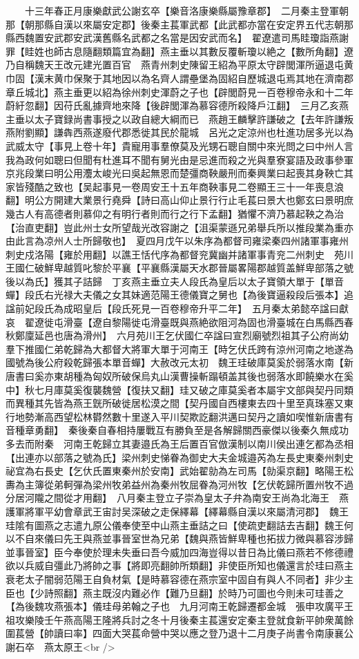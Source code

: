 　　十三年春正月康樂獻武公謝玄卒【樂音洛康樂縣屬豫章郡】　二月秦主登軍朝那【朝那縣自漢以來屬安定郡】後秦主萇軍武都【此武都亦當在安定界五代志朝那縣西魏置安武郡安武漢舊縣名武都之名當是因安武而名】　翟遼遣司馬眭瓊詣燕謝罪【眭姓也師古息隨翻類篇宜為翻】燕主垂以其數反覆斬瓊以絶之【數所角翻】遼乃自稱魏天王改元建光置百官　燕青州刺史陳留王紹為平原太守辟閭渾所逼退屯黄巾固【漢末黄巾保聚于其地因以為名齊人謂壘堡為固紹自歷城退屯焉其地在濟南郡章丘城北】燕主垂更以紹為徐州刺史渾蔚之子也【辟閭蔚見一百卷穆帝永和十二年蔚紆忽翻】因苻氏亂據齊地來降【後辟閭渾為慕容德所殺降戶江翻】　三月乙亥燕主垂以太子寶録尚書事授之以政自總大綱而已　燕趙王麟擊許謙破之【去年許謙叛燕附劉顯】謙犇西燕遂廢代郡悉徙其民於龍城　呂光之定涼州也杜進功居多光以為武威太守【事見上卷十年】貴寵用事羣僚莫及光甥石聰自關中來光問之曰中州人言我為政何如聰曰但聞有杜進耳不聞有舅光由是忌進而殺之光與羣寮宴語及政事參軍京兆段業曰明公用灋太峻光曰吳起無恩而楚彊商鞅嚴刑而秦興業曰起喪其身鞅亡其家皆殘酷之致也【吴起事見一卷周安王十五年商鞅事見二卷顯王三十一年喪息浪翻】明公方開建大業景行堯舜【詩曰高山仰止景行行止毛萇曰景大也鄭玄曰景明庶幾古人有高德者則慕仰之有明行者則而行之行下孟翻】猶懼不濟乃慕起鞅之為治【治直吏翻】豈此州士女所望哉光改容謝之【沮渠蒙遜兄弟舉兵所以推段業為重亦由此言為凉州人士所歸敬也】　夏四月戊午以朱序為都督司雍梁秦四州諸軍事雍州刺史戍洛陽【雍於用翻】以譙王恬代序為都督兖冀幽并諸軍事青兖二州刺史　苑川王國仁破鮮卑越質叱黎於平襄【平襄縣漢屬天水郡晉屬畧陽郡越質盖鮮卑部落之號後以為氏】獲其子詰歸　丁亥燕主垂立夫人段氏為皇后以太子寶領大單于【單音蟬】段氏右光禄大夫儀之女其妹適范陽王德儀寶之舅也【為後寶逼殺段后張本】追諡前妃段氏為成昭皇后【段氏死見一百卷穆帝升平二年】　五月秦太弟懿卒諡曰獻哀　翟遼徙屯滑臺【遼自黎陽徙屯滑臺既與燕絶欲阻河為固也滑臺城在白馬縣西春秋鄭廩延邑也唐為滑州】　六月苑川王乞伏國仁卒諡曰宣烈廟號烈祖其子公府尚幼羣下推國仁弟乾歸為大都督大將軍大單于河南王【時乞伏氏跨有涼州河南之地遂為國號為後公府殺乾歸張本單音蟬】大赦改元太初　魏王珪破庫莫奚於弱落水南【新唐書曰奚亦東胡種為匈奴所破保烏丸山漢曹操斬蹋頓盖其後也弱落水即饒樂水在奚中】秋七月庫莫奚復襲魏營【復扶又翻】珪又破之庫莫奚者本屬宇文部與契丹同類而異種其先皆為燕王皝所破徙居松漠之間【契丹國自西樓東去四十里至真珠塞又東行地勢漸高西望松林欎然數十里遂入平川契欺訖翻洪邁曰契丹之讀如喫惟新唐書有音種章勇翻】　秦後秦自春相持屢戰互有勝負至是各解歸關西豪傑以後秦久無成功多去而附秦　河南王乾歸立其妻邉氏為王后置百官倣漢制以南川侯出連乞都為丞相【出連亦以部落之號為氏】梁州刺史悌眷為御史大夫金城邉芮為左長史東秦州刺史祕宜為右長史【乞㐲氏置東秦州於安南】武始翟勍為左司馬【勍渠京翻】略陽王松夀為主簿從弟軻彈為梁州牧弟益州為秦州牧屈眷為河州牧【乞伏乾歸所置州牧不過分居河隴之間從才用翻】　八月秦主登立子崇為皇太子弁為南安王尚為北海王　燕護軍將軍平幼會章武王宙討吴深破之走保繹幕【繹幕縣自漢以來屬清河郡】　魏王珪隂有圖燕之志遣九原公儀奉使至中山燕主垂詰之曰【使疏吏翻詰去吉翻】魏王何以不自來儀曰先王與燕並事晉室世為兄弟【魏與燕皆鮮卑種也拓拔力微與慕容涉歸並事晉室】臣今奉使於理未失垂曰吾今威加四海豈得以昔日為比儀曰燕若不修德禮欲以兵威自彊此乃將帥之事【將即亮翻帥所類翻】非使臣所知也儀還言於珪曰燕主衰老太子闇弱范陽王自負材氣【是時慕容德在燕宗室中固自有與人不同者】非少主臣也【少詩照翻】燕主既沒内難必作【難乃旦翻】於時乃可圖也今則未可珪善之【為後魏攻燕張本】儀珪母弟翰之子也　九月河南王乾歸遷都金城　張申攻廣平王祖攻樂陵壬午燕高陽王隆將兵討之冬十月後秦主萇還安定秦主登就食新平帥衆萬餘圍萇營【帥讀曰率】四面大哭萇命營中哭以應之登乃退十二月庚子尚書令南康襄公謝石卒　燕太原王<br />
